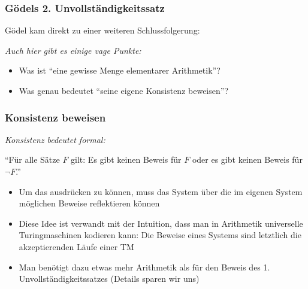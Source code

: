 \documentclass[aspectratio=1610,onlymath]{beamer}
\begin{document}
\begin{frame}\frametitle{Gödels 2. Unvollständigkeitssatz}

Gödel kam direkt zu einer weiteren Schlussfolgerung:\medskip

\bigskip

\emph{Auch hier gibt es einige vage Punkte:}
\begin{itemize}
\item Was ist \alert{"`eine gewisse Menge elementarer Arithmetik"'}?
\item Was genau bedeutet \alert{"`seine eigene Konsistenz beweisen"'}?
\end{itemize}

\end{frame}

\begin{frame}\frametitle{Konsistenz beweisen}

\emph{Konsistenz bedeutet formal:}\medskip

"`Für alle Sätze $F$ gilt: Es gibt keinen Beweis für $F$ oder es gibt keinen Beweis für $\neg F$."'
\bigskip

\begin{itemize}
\item Um das ausdrücken zu können, muss das System über die im eigenen System möglichen Beweise reflektieren können
\item Diese Idee ist verwandt mit der Intuition, dass man in Arithmetik universelle Turingmaschinen kodieren kann: Die Beweise eines Systems sind letztlich die akzeptierenden Läufe einer TM
\item Man benötigt dazu etwas mehr Arithmetik als für den Beweis des 1. Unvollständigkeitssatzes (Details sparen wir uns)
\end{itemize}

\end{frame}
\end{document}
